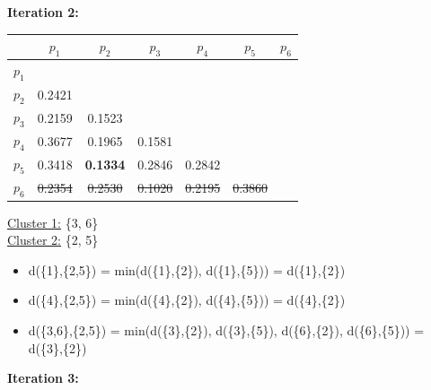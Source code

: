 \documentclass[11pt]{article}
\begin{document}
	\vspace{5mm}
	
	\textbf{Iteration 2:}
	
	\begin{center}
    	\begin{adjustbox}{max width=\textwidth}
		\begin{tabular}{ | c | c | c | c | c | c | c |}
	  	 	\hline

	  	 	& \textbf{$p_1$} & \textbf{$p_2$} & \textbf{$p_3$} & \textbf{$p_4$} & \textbf{$p_5$} & \textbf{$p_6$}\\
	  	 	\hline
	  	 	
	  	 	\textbf{$p_1$} &  &  &  &  &  &\\
	  	 	\hline
	  	 	
	  	 	\textbf{$p_2$} & 0.2421 &  &  &  &  &  \\
	  	 	\hline
	  	 	
	  	 	\textbf{$p_3$} & 0.2159 & 0.1523 &  &  &  & \\
	  	 	\hline
	  	 	
	  	 	\textbf{$p_4$} & 0.3677 & 0.1965 & 0.1581 &  &  & \\
	  	 	\hline
	  	 	
	  	 	\textbf{$p_5$} & 0.3418 & \textbf{0.1334} & 0.2846 & 0.2842 &  & \\
	  	 	\hline	
	  	 	
	  	 	\textbf{$p_6$} & \st{0.2354} & \st{0.2530} & \st{0.1020} & \st{0.2195} & \st{0.3860} & \\
	  	 	\hline			
    		\end{tabular}
    	\end{adjustbox}
	\end{center}
	
	\underline{Cluster 1:} \{3, 6\} \\
	\underline{Cluster 2:} \{2, 5\}
	
	\begin{itemize}
		\item d(\{1\},\{2,5\}) = min(d(\{1\},\{2\}), d(\{1\},\{5\})) = d(\{1\},\{2\})
		\item d(\{4\},\{2,5\}) = min(d(\{4\},\{2\}), d(\{4\},\{5\})) = d(\{4\},\{2\})
		\item d(\{3,6\},\{2,5\}) = min(d(\{3\},\{2\}), d(\{3\},\{5\}), d(\{6\},\{2\}), d(\{6\},\{5\})) = d(\{3\},\{2\})
	\end{itemize}
	
	
	\vspace{5mm}
	
	
	\textbf{Iteration 3:}
	
\end{document}
